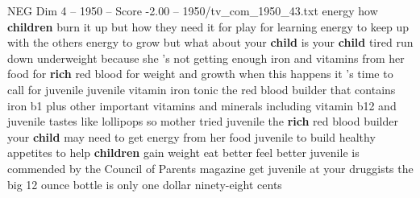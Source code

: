 \begin{textsample}{NEG Dim 4 – 1950 – Score -2.00 – 1950/tv\_com\_1950\_43.txt}  \label{ex:f4_neg_018}
energy how \textbf{children} burn it up but how they need it for play for learning energy to keep up with the others energy to grow but what about your \textbf{child} is your \textbf{child} tired run down underweight because she 's not getting enough iron and vitamins from her food for \textbf{rich} red blood for weight and growth when this happens it 's time to call for juvenile juvenile vitamin iron tonic the red blood builder that contains iron b1 plus other important vitamins and minerals including vitamin b12 and juvenile tastes like lollipops so mother tried juvenile the \textbf{rich} red blood builder your \textbf{child} may need to get energy from her food juvenile to build healthy appetites to help \textbf{children} gain weight eat better feel better juvenile is commended by the Council of Parents magazine get juvenile at your druggists the big 12 ounce bottle is only one dollar ninety-eight cents

\end{textsample}
